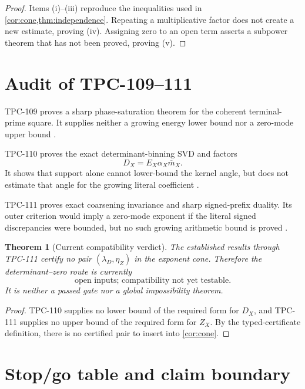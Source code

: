 \documentclass[11pt,a4paper]{article}
\newtheorem{theorem}{Theorem}[section]
\theoremstyle{definition}
\theoremstyle{remark}
\begin{document}
\begin{proof}
Items (i)--(iii) reproduce the inequalities used in
\cref{cor:cone,thm:independence}.  Repeating a multiplicative factor
does not create a new estimate, proving (iv).  Assigning zero to an
open term asserts a subpower theorem that has not been proved,
proving (v).
\end{proof}

\section{Audit of TPC-109--111}

TPC-109 proves a sharp phase-saturation theorem for the coherent
terminal-prime square.  It supplies neither a growing energy lower
bound nor a zero-mode upper bound \citep{WangTPC109}.

TPC-110 proves the exact determinant-binning SVD and factors
\[
 D_X=E_X\alpha_X\overline m_X.
\]
It shows that support alone cannot lower-bound the kernel angle, but
does not estimate that angle for the growing literal coefficient
\citep{WangTPC110}.

TPC-111 proves exact coarsening invariance and sharp signed-prefix
duality.  Its outer criterion would imply a zero-mode exponent if the
literal signed discrepancies were bounded, but no such growing
arithmetic bound is proved \citep{WangTPC111}.

\begin{theorem}[Current compatibility verdict]
\label{thm:verdict}
The established results through TPC-111 certify no pair
\((\lambda_D,\eta_Z)\) in the exponent cone.  Therefore the
determinant--zero route is currently
\[
 \boxed{\text{open inputs; compatibility not yet testable}.}
\]
It is neither a passed gate nor a global impossibility theorem.
\end{theorem}

\begin{proof}
TPC-110 supplies no lower bound of the required form for \(D_X\), and
TPC-111 supplies no upper bound of the required form for \(Z_X\).
By the typed-certificate definition, there is no certified pair to
insert into \cref{cor:cone}.
\end{proof}

\section{Stop/go table and claim boundary}
\end{document}
